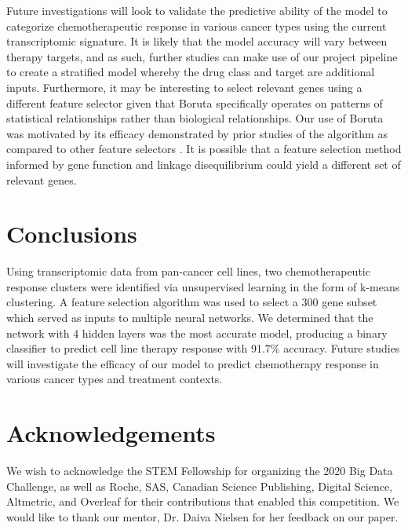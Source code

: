 \documentclass[10pt, letterpaper]{article}
\begin{document}
\begin{multicols*}{2}
Future investigations will look to validate the predictive ability of the model to categorize chemotherapeutic response in various cancer types using the current transcriptomic signature. It is likely that the model accuracy will vary between therapy targets, and as such, further studies can make use of our project pipeline to create a stratified model whereby the drug class and target are additional inputs. Furthermore, it may be interesting to select relevant genes using a different feature selector given that Boruta specifically operates on patterns of statistical relationships rather than biological relationships. Our use of Boruta was motivated by its efficacy demonstrated by prior studies of the algorithm as compared to other feature selectors \cite{boruta, deep_cell}. It is possible that a feature selection method informed by gene function and linkage disequilibrium could yield a different set of relevant genes.


\section{Conclusions}
Using transcriptomic data from pan-cancer cell lines, two chemotherapeutic response clusters were identified via unsupervised learning in the form of k-means clustering. A feature selection algorithm was used to select a 300 gene subset which served as inputs to multiple neural networks. We determined that the network with 4 hidden layers was the most accurate model, producing a binary classifier to predict cell line therapy response with 91.7\% accuracy. Future studies will investigate the efficacy of our model to predict chemotherapy response in various cancer types and treatment contexts.


\section*{Acknowledgements}
We wish to acknowledge the STEM Fellowship for organizing the 2020 Big Data Challenge, as well as Roche, SAS, Canadian Science Publishing, Digital Science, Altmetric, and Overleaf for their contributions that enabled this competition. We would like to thank our mentor, Dr. Daiva Nielsen for her feedback on our paper.




\end{multicols*}



\clearpage
\end{document}
